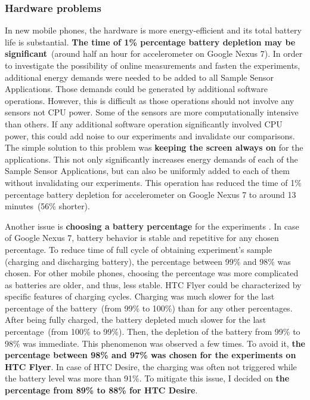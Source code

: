 \subsubsection{Hardware problems}
In new mobile phones, the hardware is more energy-efficient and its total battery life is substantial. \textbf{The time of 1\% percentage battery depletion may be significant}\ (around half an hour for accelerometer on Google Nexus 7). In order to investigate the possibility of online measurements and fasten the experiments, additional energy demands were needed to be added to all Sample Sensor Applications. Those demands could be generated by additional software operations. However, this is difficult as those operations should not involve any sensors not CPU power. Some of the sensors are more computationally intensive than others. If any additional software operation significantly involved CPU power, this could add noise to our experiments and invalidate our comparisons. The simple solution to this problem was \textbf{keeping the screen always on} for the applications.  This not only significantly increases energy demands of each of the Sample Sensor Applications, but can also be uniformly added to each of them without invalidating our experiments.  This operation has reduced the time of 1\% percentage battery depletion for accelerometer on Google Nexus 7 to around 13 minutes\ (56\% shorter).  

Another issue is \textbf{choosing a battery percentage} for the experiments . In case of Google Nexus 7, battery behavior is stable and repetitive for any chosen percentage. To reduce time of full cycle of obtaining experiment's sample (charging and discharging battery),  the percentage between 99\% and 98\% was chosen. For other mobile phones, choosing the percentage was more complicated as batteries are older, and thus, less stable. HTC Flyer could be characterized by specific features of charging cycles. Charging was much slower for the last percentage of the battery\ (from 99\% to 100\%) than for any other percentages. After being fully charged, the battery depleted much slower for the last percentage\ (from 100\% to 99\%). Then, the depletion of the battery from 99\% to 98\% was immediate.  This phenomenon was observed a few times. To avoid it, \textbf{the percentage between 98\% and 97\% was chosen for the experiments on HTC Flyer}. In case of HTC Desire, the charging was often not triggered while the battery level was more than 91\%. To mitigate this issue, I decided on \textbf{the percentage from 89\% to 88\% for HTC Desire}. 

